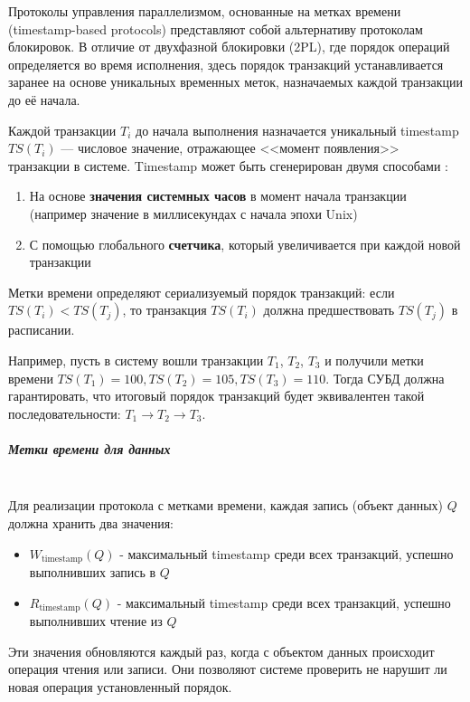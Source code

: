Протоколы управления параллелизмом, основанные на метках времени (timestamp-based protocols) представляют собой альтернативу протоколам блокировок. В отличие от двухфазной блокировки (2PL), где порядок операций определяется во время исполнения, здесь порядок транзакций устанавливается заранее на основе уникальных временных меток, назначаемых каждой транзакции до её начала.

Каждой транзакции $T_i$ до начала выполнения назначается уникальный timestamp $TS(T_i)$ — числовое значение, отражающее <<момент появления>> транзакции в системе. Timestamp может быть сгенерирован двумя способами \autocite[ch.18 §5]{Silberschatz}:
\begin{enumerate}
    \item На основе \textbf{значения системных часов} в момент начала транзакции (например значение в миллисекундах с начала эпохи Unix)
    \item С помощью глобального \textbf{счетчика}, который увеличивается при каждой новой транзакции 
\end{enumerate}

Метки времени определяют сериализуемый порядок транзакций: если $TS(T_i) < TS(T_j)$, то транзакция $TS(T_i)$ должна предшествовать $TS(T_j)$ в расписании.

Например, пусть в систему вошли транзакции $T_1$, $T_2$, $T_3$ и получили метки времени $TS(T_1) = 100, TS(T_2) = 105, TS(T_3) = 110$. Тогда СУБД должна гарантировать, что итоговый порядок транзакций будет эквивалентен такой последовательности: $T_1 \rightarrow T_2 \rightarrow T_3$.

\subparagraph{Метки времени для данных} ~\\

Для реализации протокола с метками времени, каждая запись (объект данных) $Q$ должна хранить два значения:

\begin{itemize}
    \item $W_{\text{timestamp}}(Q)$ - максимальный timestamp среди всех транзакций, успешно выполнивших запись в $Q$
    \item $R_{\text{timestamp}}(Q)$ - максимальный timestamp среди всех транзакций, успешно выполнивших чтение из $Q$
\end{itemize}


Эти значения обновляются каждый раз, когда с объектом данных происходит операция чтения или записи. Они позволяют системе проверить не нарушит ли новая операция установленный порядок.

